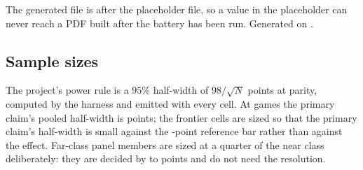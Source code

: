 The generated file is \verb|| after the placeholder file, so a value in the placeholder can never
reach a PDF built after the battery has been run. Generated on \vsevenBuildDate{}.

\subsection*{Sample sizes}

The project's power rule is a $95\%$ half-width of $98/\sqrt{N}$ points at parity, computed by the
harness and emitted with every cell. At \vsevenBtwoFcheapN{} games the primary claim's pooled half-width is
\vsevenBtwoFcheapHalfWidth{} points; the
frontier cells are sized so that the primary claim's half-width is small against the
\vsevenPrimaryFloor{}-point reference bar rather than against the effect. Far-class panel members are
sized at a quarter of the near class deliberately: they are decided by \vsevenFarSpanLo{} to \vsevenFarSpanHi{} points
and do not need the resolution.
